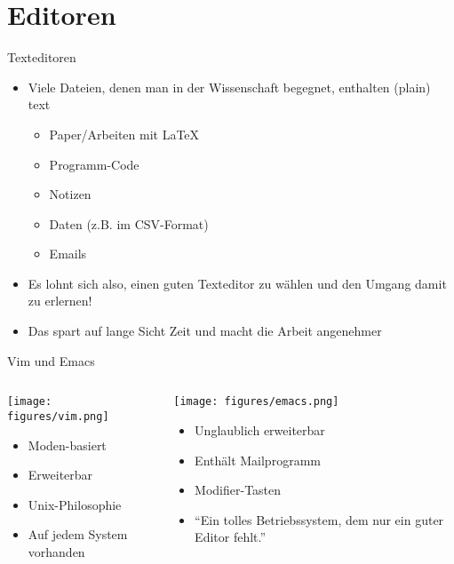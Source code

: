 \section{Editoren}




\begin{frame}{Texteditoren}
  \begin{itemize}
    \item Viele Dateien, denen man in der Wissenschaft begegnet, enthalten (plain) text
      \begin{itemize}
        \item Paper/Arbeiten mit \LaTeX
        \item Programm-Code
        \item Notizen
        \item Daten (z.B. im CSV-Format)
        \item Emails
      \end{itemize}
    \item Es lohnt sich also, einen guten Texteditor zu wählen und den Umgang damit zu erlernen!
    \item Das spart auf lange Sicht Zeit und macht die Arbeit angenehmer
  \end{itemize}
\end{frame}

\begin{frame}{Vim und Emacs}
  \begin{columns}
    \begin{column}{0.47\textwidth}
      \texttt{[image: figures/vim.png]}
      \begin{itemize}
        \item Moden-basiert
        \item Erweiterbar
        \item Unix-Philosophie
        \item Auf jedem System vorhanden
      \end{itemize}
    \end{column}
    \begin{column}{0.47\textwidth}
      \texttt{[image: figures/emacs.png]}
      \begin{itemize}
        \item Unglaublich erweiterbar
        \item Enthält Mailprogramm
        \item Modifier-Tasten
        \item \enquote{Ein tolles Betriebssystem, dem nur ein guter Editor fehlt.}
      \end{itemize}
    \end{column}
  \end{columns}
\end{frame}

